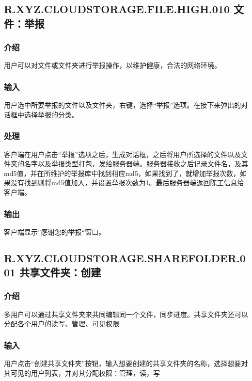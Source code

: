 \subsection{R.XYZ.CLOUDSTORAGE.FILE.HIGH.010 文件：举报}

\subsubsection{介绍}
用户可以对文件或文件夹进行举报操作，以维护健康，合法的网络环境。

\subsubsection{输入} 
用户选中所要举报的文件以及文件夹，右键，选择“举报”选项。在接下来弹出的对话框中选择举报的分类。

\subsubsection{处理} 
客户端在用户点击“举报”选项之后，生成对话框，之后将用户所选择的文件以及文件夹的名字以及举报类型打包，发给服务器端。服务器接收之后记录文件名，及其md5值，并在所维护的举报库中找到相应md5，如果找到了，就增加举报次数，如果没有找到则将md5值加入，并设置举报次数为1。最后服务器端返回陈工信息给客户端。

\subsubsection{输出} 
客户端显示”感谢您的举报“窗口。

\subsection{R.XYZ.CLOUDSTORAGE.SHAREFOLDER.001 共享文件夹：创建}

\subsubsection{介绍}

多用户可以通过共享文件夹来共同编辑同一个文件，同步进度。共享文件夹还可以分配各个用户的读写、管理、可见权限

\subsubsection{输入} 

用户点击“创建共享文件夹”按钮，输入想要创建的共享文件夹的名称，选择想要对其可见的用户列表，并对其分配权限：管理，读，写

